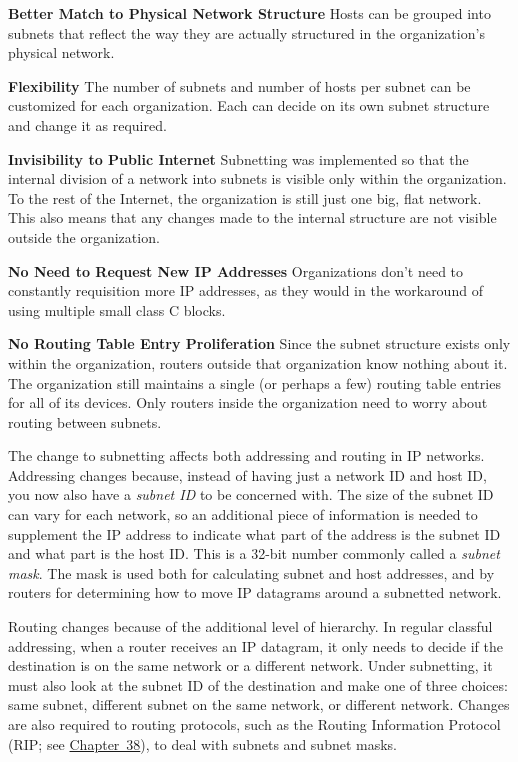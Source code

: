 {\textbf{Better Match to Physical Network Structure}} Hosts can be
grouped into subnets that reflect the way they are actually structured
in the organization's physical network.

{\textbf{Flexibility}} The number of subnets and number of hosts per
subnet can be customized for each organization. Each can decide on its
own subnet structure and change it as required.

{\textbf{Invisibility to Public Internet}} Subnetting was implemented so
that the internal division of a network into subnets is visible only
within the organization. To the rest of the Internet, the organization
is still just one big, flat network. This also means that any changes
made to the internal structure are not visible outside the organization.

{\textbf{No Need to Request New IP Addresses}} Organizations don't need
to constantly requisition more IP addresses, as they would in the
workaround of using multiple small class C blocks.

{\textbf{No Routing Table Entry Proliferation}} Since the subnet
structure exists only within the organization, routers outside that
organization know nothing about it. The organization still maintains a
single (or perhaps a few) routing table entries for all of its devices.
Only routers inside the organization need to worry about routing between
subnets.

The change to subnetting affects both addressing and routing in IP
networks. Addressing changes because, instead of having just a network
ID and host ID, you now also have a {\emph{subnet ID}} to be concerned
with. The size of the subnet ID can vary for each network, so an
additional piece of information is needed to supplement the IP address
to indicate what part of the address is the subnet ID and what part is
the host ID. This is a 32-bit number commonly called a {\emph{subnet
mask}}. The mask is used both for calculating subnet and host addresses,
and by routers for determining how to move IP datagrams around a
subnetted network.

Routing changes because of the additional level of hierarchy. In regular
classful addressing, when a router receives an IP datagram, it only
needs to decide if the destination is on the same network or a different
network. Under subnetting, it must also look at the subnet ID of the
destination and make one of three choices: same subnet, different subnet
on the same network, or different network. Changes are also required to
routing protocols, such as the Routing Information Protocol (RIP; see
\protect\hyperlink{ch38.html}{Chapter~38}), to deal with subnets and
subnet masks.


